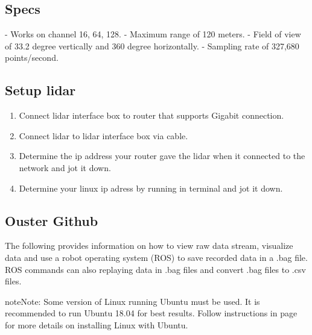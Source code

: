 \documentclass[letterpaper,10pt,english]{sphinxmanual}
\begin{document}
\subsection{Specs}
\label{\detokenize{Ouster lidar:specs}}
- Works on channel 16, 64, 128.
- Maximum range of 120 meters.
- Field of view of 33.2 degree vertically and 360 degree horizontally.
- Sampling rate of 327,680 points/second.


\subsection{Setup lidar}
\label{\detokenize{Ouster lidar:setup-lidar}}\begin{enumerate}
\def\theenumi{\arabic{enumi}}
\def\labelenumi{\theenumi .}
\makeatletter\def\p@enumii{\p@enumi \theenumi .}\makeatother
\item {} 
Connect lidar interface box to router that supports Gigabit connection.

\item {} 
Connect lidar to lidar interface box via cable.

\item {} 
Determine the ip address your router gave the lidar when it connected to the network and jot it down.

\item {} 
Determine your linux ip adress by running  in terminal and jot it down.

\end{enumerate}


\subsection{Ouster Github}
\label{\detokenize{Ouster lidar:ouster-github}}
The following  provides information on how to view raw data stream, visualize data and use a robot operating system (ROS) to save recorded data in a .bag file.
ROS commands can also replaying data in .bag files and convert .bag files to .csv files.

\begin{sphinxadmonition}{note}{Note:}
Some version of Linux running Ubuntu must be used. It is recommended to run Ubuntu 18.04 for best results. Follow instructions in  page for more details on installing Linux with Ubuntu.
\end{sphinxadmonition}
\end{document}
